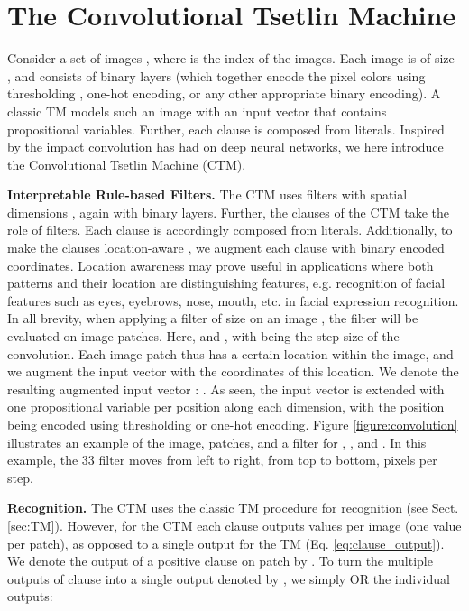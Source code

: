 \documentclass{article}
\begin{document}
\section{The Convolutional Tsetlin Machine}
\label{sec:CTM}

Consider a set of images , where  is the index of the images. Each image is of size , and consists of  binary layers (which together encode the pixel colors using thresholding \cite{Abeyrathna2019}, one-hot encoding, or any other appropriate binary encoding). A classic TM models such an image with an input vector  that contains  propositional variables. Further, each clause is composed from  literals. Inspired by the impact convolution has had on deep neural networks, we here introduce the Convolutional Tsetlin Machine (CTM).

\textbf{Interpretable Rule-based Filters.} The CTM uses filters with spatial dimensions , again with  binary layers. Further, the clauses of the CTM take the role of filters. Each clause is accordingly composed from  literals. Additionally, to make the clauses location-aware \cite{Liu2018}, we augment each clause with binary encoded coordinates. Location awareness may prove useful in applications where both patterns and their location are distinguishing features, e.g. recognition of facial features such as eyes, eyebrows, nose, mouth, etc. in facial expression recognition. In all brevity, when applying a filter of size  on an image , the filter will be evaluated on  image patches. Here,  and ,  with  being the step size of the convolution. Each image patch thus has a certain location within the image, and we augment the input vector with the coordinates of this location. We denote the resulting augmented input vector :  . As seen, the input vector is extended with one propositional variable per position along each dimension, with the position being encoded using thresholding \cite{Abeyrathna2019} or one-hot encoding. Figure \ref{figure:convolution} illustrates an example of the image, patches, and a filter for , , and . In this example, the 33 filter moves from left to right, from top to bottom,   pixels per step.

\textbf{Recognition.} The CTM uses the classic TM procedure for recognition (see Sect. \ref{sec:TM}). However, for the CTM each clause outputs  values per image (one value per patch), as opposed to a single output for the TM (Eq. \ref{eq:clause_output}). We denote the output of a positive clause  on patch  by .  To turn the multiple outputs 
of clause  into a single output denoted by , we simply OR the individual outputs:
\end{document}
